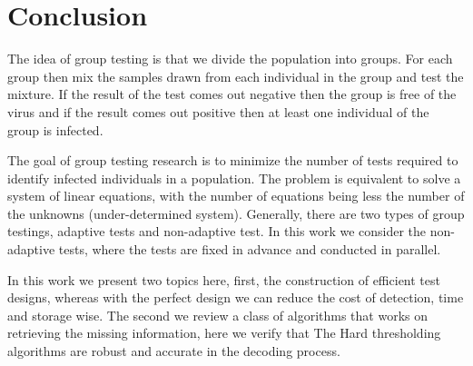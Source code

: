 \chapter*{Conclusion}

The idea of group testing is that we divide the population into groups. For each group then mix the samples drawn from each individual in the group and test the mixture. If the result of the test comes out negative then the group is free of the virus and if the result comes out positive then at least one individual of the group is infected. 


The goal of group testing research is to minimize the number of tests required to identify infected individuals in a population.  The problem is equivalent to solve a system of linear equations, with the number of equations being less the number of the unknowns (under-determined system).  Generally, there are two types of group testings, adaptive tests and non-adaptive test. In this work we consider the non-adaptive tests, where the tests are fixed in advance and conducted in parallel.


In this work we present two topics here, first, the construction of efficient test designs, whereas with the perfect design we can reduce the cost of detection, time and storage wise.  The second we review a class of algorithms that works on retrieving the missing information,   here we verify that The Hard thresholding algorithms are robust and accurate in the decoding process.  
